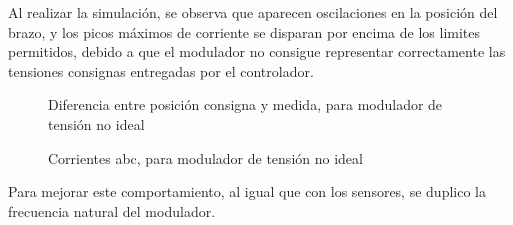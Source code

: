 \documentclass[a4paper, 10pt, onecolumn,journal]{ieeeconf}
\begin{document}
Al realizar la simulación, se observa que aparecen oscilaciones en la posición  del brazo, y los picos máximos de corriente se disparan por encima de los limites permitidos, debido a que el modulador no consigue representar correctamente las tensiones consignas entregadas por el controlador.
\begin{figure}[H]
	\centering
	\begin{adjustbox}{max width=\columnwidth}
	\end{adjustbox}
	\caption{Diferencia entre posición consigna y medida, para modulador de tensión no ideal}
	\label{Diferencia entre posición consigna y medida, para modulador de tensión no ideal}
\end{figure}

\begin{figure}[H]
	\centering
	\begin{adjustbox}{max width=\columnwidth}
	\end{adjustbox}
	\caption{Corrientes abc, para modulador de tensión no ideal}
	\label{Corrientes abc, para modulador de tensión no ideal}
\end{figure}
Para mejorar este comportamiento, al igual que con los sensores, se duplico la frecuencia natural del modulador.
\end{document}
